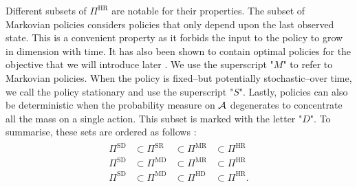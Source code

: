 Different subsets of $\Pi^{\text{HR}}$ are notable for their properties. 
The subset of Markovian policies considers policies that only depend upon the last observed state. 
This is a convenient property as it forbids the input to the policy to grow in dimension with time.
It has also been shown to contain optimal policies for the objective that we will introduce later \cite[Theorem~6.2.10 and Theorem~8.1.2]{puterman1994markov}.
We use the superscript "$M$" to refer to Markovian policies.
When the policy is fixed--but potentially stochastic--over time, we call the policy stationary and use the superscript "$S$".
Lastly, policies can also be deterministic when the probability measure on $\mathcal{A}$ degenerates to concentrate all the mass on a single action. 
This subset is marked with the letter "$D$".
To summarise, these sets are ordered as follows \cite[Section 2.1.5]{puterman1994markov}:
\begin{align*}
    \begin{array}{cccc}
         \Pi^{\text{SD}}&\subset\Pi^{\text{SR}}&\subset\Pi^{\text{MR}}&\subset\Pi^{\text{HR}}  \\
         \Pi^{\text{SD}}&\subset\Pi^{\text{MD}}&\subset\Pi^{\text{MR}}&\subset\Pi^{\text{HR}}\\
         \Pi^{\text{SD}}&\subset\Pi^{\text{MD}}&\subset\Pi^{\text{HD}}&\subset\Pi^{\text{HR}}.
    \end{array}
\end{align*}


